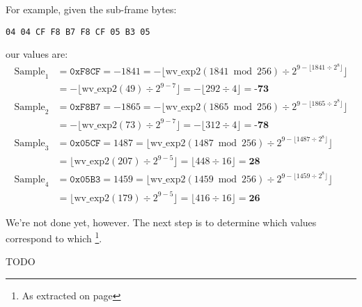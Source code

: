 \par
\noindent
For example, given the sub-frame bytes:
\begin{Verbatim}[frame=single]
04 04 CF F8 B7 F8 CF 05 B3 05
\end{Verbatim}
our  values are:
\begin{align*}
\text{Sample}_1 &= \texttt{0xF8CF} = -1841
 = -\lfloor \text{wv\_exp2}(1841 \bmod{256}) \div 2 ^ {9 - \lfloor 1841 \div 2 ^ 8 \rfloor} \rfloor \\
&= -\lfloor \text{wv\_exp2}(49) \div 2 ^ {9 - 7} \rfloor
 = -\lfloor 292 \div 4 \rfloor = \textbf{-73} \\
\text{Sample}_2 &= \texttt{0xF8B7} = -1865
 = -\lfloor \text{wv\_exp2}(1865 \bmod{256}) \div 2 ^ {9 - \lfloor 1865 \div 2 ^ 8 \rfloor} \rfloor \\
&= -\lfloor \text{wv\_exp2}(73) \div 2 ^ {9 - 7} \rfloor
 =  -\lfloor 312 \div 4 \rfloor = \textbf{-78} \\
\text{Sample}_3 &= \texttt{0x05CF} = 1487
 = \lfloor \text{wv\_exp2}(1487 \bmod{256}) \div 2 ^ {9 - \lfloor 1487 \div 2 ^ 8 \rfloor} \rfloor \\
&= \lfloor \text{wv\_exp2}(207) \div 2 ^ {9 - 5} \rfloor
 = \lfloor 448 \div 16 \rfloor = \textbf{28} \\
\text{Sample}_4 &= \texttt{0x05B3} = 1459
 = \lfloor \text{wv\_exp2}(1459 \bmod{256}) \div 2 ^ {9 - \lfloor 1459 \div 2 ^ 8 \rfloor} \rfloor \\
&= \lfloor \text{wv\_exp2}(179) \div 2 ^ {9 - 5} \rfloor
 = \lfloor 416 \div 16 \rfloor = \textbf{26}
\end{align*}

\clearpage

We're not done yet, however.
The next step is to determine which 
values correspond to which \footnote{As
extracted on page \pageref{wavpack_decorr_terms}}.

TODO


\clearpage

